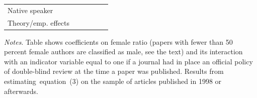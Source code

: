 \begin{table}[H]
\begin{threeparttable}
\begin{tabular}{p{4cm}S@{}S@{}S@{}S@{}S@{}}
            Native speaker                &           {}   &           {}   &           {}   &           {}   &           {}   \\
            Theory/emp. effects           &           {}   &           {}   &           {}   &           {}   &           {}   \\
            \bottomrule
        \end{tabular}
        \begin{tablenotes}
            \tiny
            \item \textit{Notes}. Table shows coefficients on female ratio (papers with fewer than 50 percent female authors are classified as male, see the text) and its interaction with an indicator variable equal to one if a journal had in place an official policy of double-blind review at the time a paper was published. Results from estimating~equation~(3) on the sample of articles published in 1998 or afterwards.
        \end{tablenotes}
    \end{threeparttable}
\end{table}